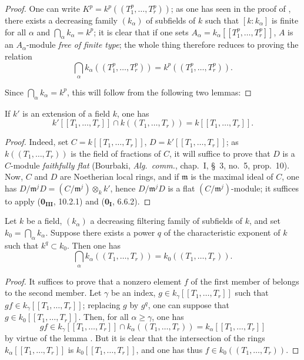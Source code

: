 \begin{proof}
One can write $K^p=k^p((T_1^p,\ldots,T_r^p))$; as one has seen in the proof of , there exists a decreasing family $(k_\alpha)$ of subfields of $k$ such that $[k:k_\alpha]$ is finite for all $\alpha$ and $\bigcap_\alpha k_\alpha=k^p$; it is clear that if one sets $A_\alpha=k_\alpha[[T_1^p,\ldots,T_r^p]]$, $A$ is an $A_\alpha$-module \emph{free of finite type}; the whole thing therefore reduces to proving the relation
\begin{equation}
\tag{21.8.8.1}
  \label{0.21.8.8.1}
  \bigcap_\alpha k_\alpha((T_1^p,\ldots,T_r^p))=k^p((T_1^p,\ldots,T_r^p)).
\end{equation}

Since $\bigcap_\alpha k_\alpha=k^p$, this will follow from the following two lemmas:
\end{proof}

\begin{lemma}[21.8.8.2]
\label{0.21.8.8.2}
If $k'$ is an extension of a field $k$, one has
\[
  k'[[T_1,\ldots,T_r]]\cap k((T_1,\ldots,T_r))=k[[T_1,\ldots,T_r]].
\]
\end{lemma}

\begin{proof}
Indeed, set $C=k[[T_1,\ldots,T_r]]$, $D=k'[[T_1,\ldots,T_r]]$; as $k((T_1,\ldots,T_r))$ is the field of fractions of $C$, it will suffice to prove that $D$ is a $C$-module \emph{faithfully flat} (Bourbaki, \emph{Alg.\ comm.}, chap.~I, \S~3, no.~5, prop.~10).
Now, $C$ and $D$ are Noetherian local rings, and if $\mathfrak{m}$ is the maximal ideal of $C$, one has $D/\mathfrak{m}^j D=(C/\mathfrak{m}^j)\otimes_k k'$, hence $D/\mathfrak{m}^j D$ is a flat $(C/\mathfrak{m}^j)$-module; it suffices to apply ($\mathbf{0_{III}}$, 10.2.1) and ($\mathbf{0_I}$, 6.6.2).
\end{proof}

\begin{lemma}[21.8.8.3]
\label{0.21.8.8.3}
Let $k$ be a field, $(k_\alpha)$ a decreasing filtering family of subfields of $k$, and set $k_0=\bigcap_\alpha k_\alpha$.
Suppose there exists a power $q$ of the characteristic exponent of $k$ such that $k^q\subset k_0$.
Then one has
\begin{equation}
\tag{21.8.8.4}
  \label{0.21.8.8.4}
  \bigcap_\alpha k_\alpha((T_1,\ldots,T_r))=k_0((T_1,\ldots,T_r)).
\end{equation}
\end{lemma}

\begin{proof}
It suffices to prove that a nonzero element $f$ of the first member of  belongs to the second member.
Let $\gamma$ be an index, $g\in k_\gamma[[T_1,\ldots,T_r]]$ such that $gf\in k_\gamma[[T_1,\ldots,T_r]]$; replacing $g$ by $g^q$, one can suppose that $g\in k_0[[T_1,\ldots,T_r]]$.
Then, for all $\alpha\geqslant\gamma$, one has
\[
  gf\in k_\gamma[[T_1,\ldots,T_r]]\cap k_\alpha((T_1,\ldots,T_r))=k_\alpha[[T_1,\ldots,T_r]]
\]
by virtue of the lemma .
But it is clear that the intersection of the rings $k_\alpha[[T_1,\ldots,T_r]]$ is $k_0[[T_1,\ldots,T_r]]$, and one has thus $f\in k_0((T_1,\ldots,T_r))$.
\end{proof}

